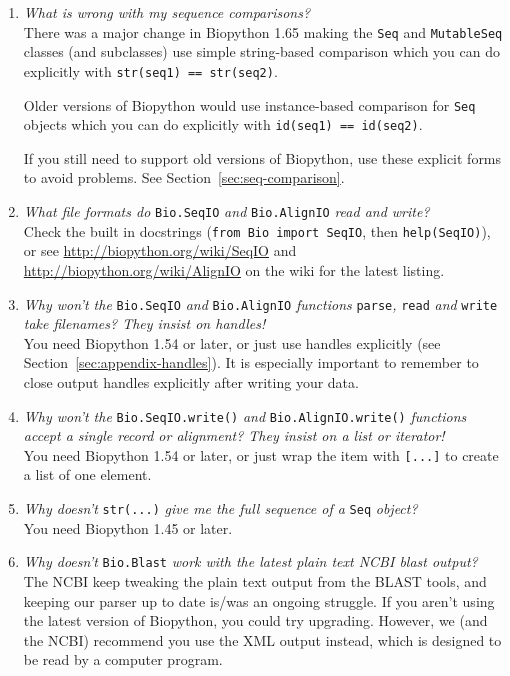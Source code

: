 \begin{enumerate}
  \item \emph{What is wrong with my sequence comparisons?} \\
  There was a major change in Biopython 1.65 making the \verb|Seq| and
  \verb|MutableSeq| classes (and subclasses) use simple string-based
  comparison which you can do explicitly with \verb|str(seq1) == str(seq2)|.

  Older versions of Biopython would use instance-based comparison
  for \verb|Seq| objects which you can do explicitly with
  \verb|id(seq1) == id(seq2)|.

  If you still need to support old versions of Biopython, use these
  explicit forms to avoid problems. See Section~\ref{sec:seq-comparison}.

  \item \emph{What file formats do} \verb|Bio.SeqIO| \emph{and} \verb|Bio.AlignIO| \emph{read and write?} \\
  Check the built in docstrings (\texttt{from Bio import SeqIO}, then \texttt{help(SeqIO)}), or see \url{http://biopython.org/wiki/SeqIO} and \url{http://biopython.org/wiki/AlignIO} on the wiki for the latest listing.

  \item \emph{Why won't the } \verb|Bio.SeqIO| \emph{and} \verb|Bio.AlignIO| \emph{functions} \verb|parse|\emph{,} \verb|read| \emph{and} \verb|write| \emph{take filenames? They insist on handles!} \\
  You need Biopython 1.54 or later, or just use handles explicitly (see Section~\ref{sec:appendix-handles}).
  It is especially important to remember to close output handles explicitly after writing your data.

  \item \emph{Why won't the } \verb|Bio.SeqIO.write()| \emph{and} \verb|Bio.AlignIO.write()| \emph{functions accept a single record or alignment? They insist on a list or iterator!} \\
  You need Biopython 1.54 or later, or just wrap the item with \verb|[...]| to create a list of one element.

  \item \emph{Why doesn't} \verb|str(...)| \emph{give me the full sequence of a} \verb|Seq| \emph{object?} \\
  You need Biopython 1.45 or later.

  \item \emph{Why doesn't} \verb|Bio.Blast| \emph{work with the latest plain text NCBI blast output?} \\
  The NCBI keep tweaking the plain text output from the BLAST tools, and keeping our parser up to date is/was an ongoing struggle.
  If you aren't using the latest version of Biopython, you could try upgrading.
  However, we (and the NCBI) recommend you use the XML output instead, which is designed to be read by a computer program.


\end{enumerate}
